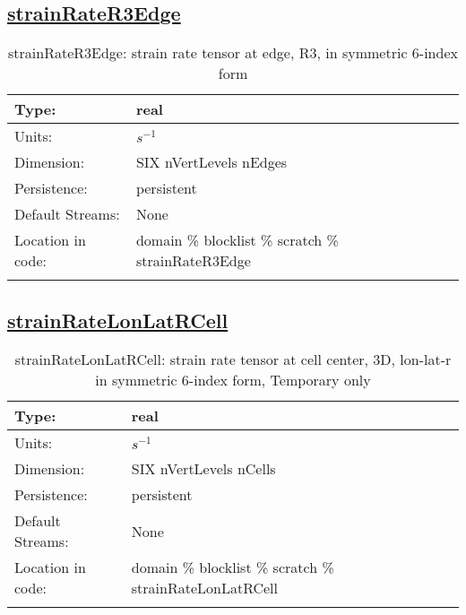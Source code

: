 \subsection[strainRateR3Edge]{\hyperref[sec:var_tab_scratch]{strainRateR3Edge}}
\label{subsec:var_sec_scratch_strainRateR3Edge}
\begin{center}
\begin{longtable}{| p{2.0in} | p{4.0in} |}
        \hline 
        Type: & real \\
        \hline 
        Units: & $s^{-1}$ \\
        \hline 
        Dimension: & SIX nVertLevels nEdges \\
        \hline 
        Persistence: & persistent \\
        \hline 
		 Default Streams: & None \\
        \hline 
		 Location in code: & domain \% blocklist \% scratch \% strainRateR3Edge \\
		 \hline 
    \caption{strainRateR3Edge: strain rate tensor at edge, R3, in symmetric 6-index form}
\end{longtable}
\end{center}
\subsection[strainRateLonLatRCell]{\hyperref[sec:var_tab_scratch]{strainRateLonLatRCell}}
\label{subsec:var_sec_scratch_strainRateLonLatRCell}
\begin{center}
\begin{longtable}{| p{2.0in} | p{4.0in} |}
        \hline 
        Type: & real \\
        \hline 
        Units: & $s^{-1}$ \\
        \hline 
        Dimension: & SIX nVertLevels nCells \\
        \hline 
        Persistence: & persistent \\
        \hline 
		 Default Streams: & None \\
        \hline 
		 Location in code: & domain \% blocklist \% scratch \% strainRateLonLatRCell \\
		 \hline 
    \caption{strainRateLonLatRCell: strain rate tensor at cell center, 3D, lon-lat-r in symmetric 6-index form, {\color{red}Temporary only}}
\end{longtable}
\end{center}
